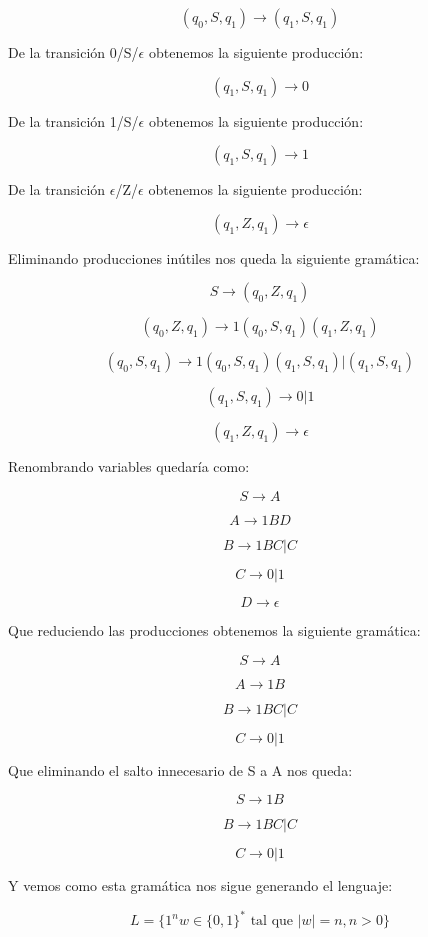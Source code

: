 \documentclass[12pt, spanish]{article}
\begin{document}
$$ (q_0, S, q_1) \rightarrow (q_1, S, q_1) $$

De la transición 0/S/$\epsilon$ obtenemos la siguiente producción:

$$ (q_1, S, q_1) \rightarrow 0$$

De la transición 1/S/$\epsilon$ obtenemos la siguiente producción:

$$ (q_1, S, q_1) \rightarrow 1$$

De la transición $\epsilon$/Z/$\epsilon$ obtenemos la siguiente producción:

$$ (q_1, Z, q_1) \rightarrow \epsilon $$



Eliminando producciones inútiles nos queda la siguiente gramática:


$$ S \rightarrow  (q_0, Z, q_1)  $$


$$ (q_0, Z, q_1) \rightarrow  1(q_0, S, q_1)(q_1, Z, q_1)   $$


$$ (q_0, S, q_1) \rightarrow 1(q_0, S, q_1)(q_1, S, q_1) | (q_1, S, q_1) $$



$$ (q_1, S, q_1) \rightarrow 0 | 1 $$

$$ (q_1, Z, q_1) \rightarrow \epsilon $$


Renombrando variables quedaría como:

$$ S \rightarrow A  $$

$$ A \rightarrow 1BD $$

$$ B \rightarrow 1BC | C $$

$$ C \rightarrow 0 | 1 $$

$$ D \rightarrow \epsilon $$

\newpage

Que reduciendo las producciones obtenemos la siguiente gramática:

$$ S \rightarrow A  $$

$$ A \rightarrow 1B $$

$$ B \rightarrow 1BC | C $$

$$ C \rightarrow 0 | 1 $$

Que eliminando el salto innecesario de S a A nos queda:

$$ S \rightarrow 1B  $$

$$ B \rightarrow 1BC | C $$

$$ C \rightarrow 0 | 1 $$


Y vemos como esta gramática nos sigue generando el lenguaje: 

$$ L = \{1^nw \in \{0,1\}^* \text{ tal que } |w|=n, n > 0 \}  $$
\end{document}
